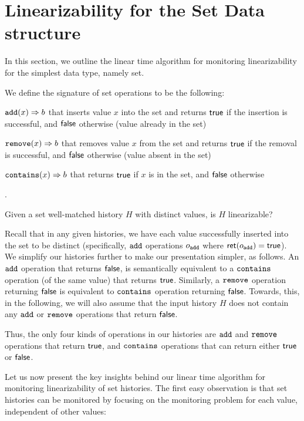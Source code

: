 
\section{Linearizability for the Set Data structure}

In this section, we outline the linear time algorithm for monitoring linearizability for the simplest data type, namely set.

We define the signature of set operations to be the following:
\begin{enumerate*}
    \item ${\tt add}(x) \Rightarrow b$ that inserts value $x$ into the set and returns ${\sf true}$ if the insertion is successful, and ${\sf false}$ otherwise (value already in the set)
    \item ${\tt remove}(x) \Rightarrow b$ that removes value $x$ from the set and returns ${\sf true}$ if the removal is successful, and ${\sf false}$ otherwise (value absent in the set)
    \item ${\tt contains}(x) \Rightarrow b$ that returns ${\sf true}$ if $x$ is in the set, and ${\sf false}$ otherwise
\end{enumerate*}. 

\begin{problem*}
   Given a set well-matched history $H$ with distinct values, is $H$ linearizable?
\end{problem*}

Recall that in any given histories, we have each value successfully inserted into the set to be distinct (specifically, ${\tt add}$ operations $o_{\tt add}$ where ${\sf ret}(o_{\tt add}) ={\sf true}$). We simplify our histories further to make our presentation simpler, as follows.
An ${\tt add}$ operation that returns ${\sf false}$, is semantically equivalent to a ${\tt contains}$ operation (of the same value) that returns ${\sf true}$. Similarly, a ${\tt remove}$ operation returning ${\sf false}$ is equivalent to ${\tt contains}$ operation returning ${\sf false}$.
Towards, this, in the following, we will also assume that the input history $H$ does not contain
any ${\tt add}$ or ${\tt remove}$ operations that return ${\sf false}$.

Thus, the only four kinds of operations in our histories are ${\tt add}$ and ${\tt remove}$ operations that return ${\sf true}$, and ${\tt contains}$ operations that can return either ${\sf true}$ or ${\sf false}$.

Let us now present the key insights behind our linear time algorithm for monitoring linearizability of set histories.
The first easy observation is that set histories can be monitored by focusing on the monitoring problem for each value, independent of other values:


